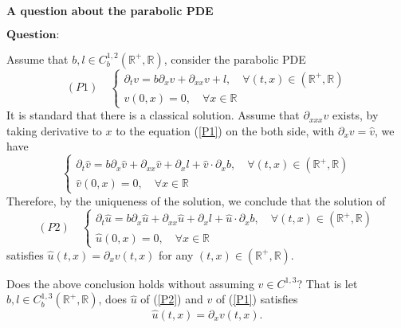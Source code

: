 \documentclass[12pt,a4paper]{ctexart}
\begin{document}
\begin{center}
\textbf{A question about the parabolic PDE}
\vspace{8pt}
\end{center}

\vspace{12pt}

$\textbf{Question:}$

Assume that $b, l \in C_{b}^{1,2} (\mathbb{R}^{+}, \mathbb{R})$, consider the parabolic PDE
\begin{equation} \label{P1}
(P1) \quad
    \begin{cases}
    \partial_{t} v = b \partial_{x} v + \partial_{xx} v + l, \quad \forall (t, x) \in (\mathbb{R}^{+}, \mathbb{R}) \\
    v(0, x) = 0, \quad \forall x \in \mathbb{R}
    \end{cases}
\end{equation}
It is standard that there is a classical solution. Assume that $\partial_{xxx} v$ exists, by taking derivative to $x$ to the equation (\ref{P1}) on the both side, with $\partial_{x} v = \hat v$, we have
\begin{equation*}
    \begin{cases}
    \partial_{t} \hat v = b \partial_{x} \hat v + \partial_{xx} \hat v + \partial_{x} l + \hat v \cdot \partial_{x} b, \quad \forall (t, x) \in (\mathbb{R}^{+}, \mathbb{R}) \\
    \hat v(0, x) = 0, \quad \forall x \in \mathbb{R}
    \end{cases}
\end{equation*}
Therefore, by the uniqueness of the solution, we conclude that the solution of
\begin{equation} \label{P2}
(P2) \quad
    \begin{cases}
    \partial_{t} \hat u = b \partial_{x} \hat u + \partial_{xx} \hat u + \partial_{x} l + \hat u \cdot \partial_{x} b, \quad \forall (t, x) \in (\mathbb{R}^{+}, \mathbb{R}) \\
    \hat u (0, x) = 0, \quad \forall x \in \mathbb{R}
    \end{cases}
\end{equation}
satisfies $\hat u (t, x) = \partial_{x} v(t, x)$ for any $(t, x) \in (\mathbb{R}^{+}, \mathbb{R})$.

Does the above conclusion holds without assuming $v \in C^{1, 3}$? That is let $b, l \in C_{b}^{1,3} (\mathbb{R}^{+}, \mathbb{R})$, does $\hat u$ of (\ref{P2}) and $v$ of (\ref{P1}) satisfies
\begin{equation*}
    \hat u (t, x) = \partial_{x} v(t, x).
\end{equation*}
\end{document}
